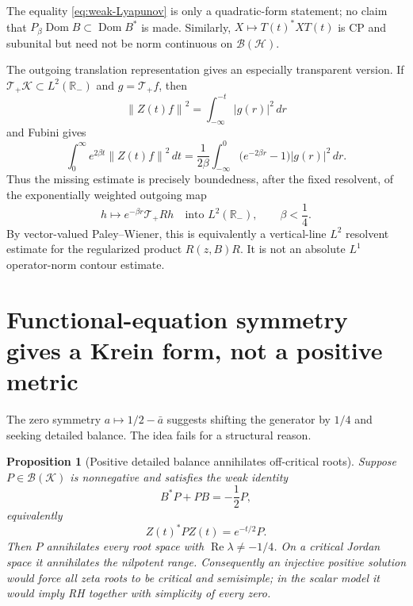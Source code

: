 \documentclass[11pt]{amsart}
\newtheorem{proposition}[theorem]{Proposition}
\theoremstyle{definition}
\theoremstyle{remark}
\DeclareMathOperator{\Dom}{Dom}
\DeclareMathOperator{\Repart}{Re}
\newcommand{\R}{\mathbb R}
\newcommand{\Bcal}{\mathcal B}
\newcommand{\Kcal}{\mathcal K}
\newcommand{\Hcal}{\mathcal H}
\newcommand{\norm}[1]{\left\lVert #1\right\rVert}
\newcommand{\abs}[1]{\left\lvert #1\right\rvert}
\begin{document}
The equality \eqref{eq:weak-Lyapunov} is only a quadratic-form statement; no
claim that $P_\beta\Dom B\subset\Dom B^*$ is made.  Similarly,
$X\mapsto T(t)^*XT(t)$ is CP and subunital but need not be norm continuous on
$\Bcal(\Hcal)$.

The outgoing translation representation gives an especially transparent
version.  If $\mathcal T_+\Kcal\subset L^2(\R_-)$ and
$g=\mathcal T_+f$, then
\begin{equation}\label{eq:outgoing-tail}
 \norm{Z(t)f}^2=\int_{-\infty}^{-t}\abs{g(r)}^2\,dr
\end{equation}
and Fubini gives
\begin{equation}\label{eq:outgoing-weight}
 \int_0^\infty e^{2\beta t}\norm{Z(t)f}^2\,dt
 =\frac1{2\beta}\int_{-\infty}^0
 \bigl(e^{-2\beta r}-1\bigr)\abs{g(r)}^2\,dr.
\end{equation}
Thus the missing estimate is precisely boundedness, after the fixed
resolvent, of the exponentially weighted outgoing map
\[
 h\longmapsto e^{-\beta r}\mathcal T_+Rh
 \quad\text{into }L^2(\R_-),
 \qquad \beta<\frac14.
\]
By vector-valued Paley--Wiener, this is equivalently a vertical-line
$L^2$ resolvent estimate for the regularized product
$R(z,B)R$.  It is not an absolute $L^1$ operator-norm contour estimate.

\section{Functional-equation symmetry gives a Krein form, not a positive metric}
\label{sec:detailed-balance}

The zero symmetry $a\mapsto1/2-\bar a$ suggests shifting the generator by
$1/4$ and seeking detailed balance.  The idea fails for a structural reason.

\begin{proposition}[Positive detailed balance annihilates off-critical roots]
\label{prop:DB-annihilates}
Suppose $P\in\Bcal(\Kcal)$ is nonnegative and satisfies the weak identity
\begin{equation}\label{eq:detailed-balance}
 B^*P+PB=-\frac12P,
\end{equation}
equivalently
\[
 Z(t)^*PZ(t)=e^{-t/2}P.
\]
Then $P$ annihilates every root space with
$\Repart\lambda\neq-1/4$.  On a critical Jordan space it annihilates the
nilpotent range.  Consequently an injective positive solution would force all
zeta roots to be critical and semisimple; in the scalar model it would imply
RH together with simplicity of every zero.
\end{proposition}
\end{document}
